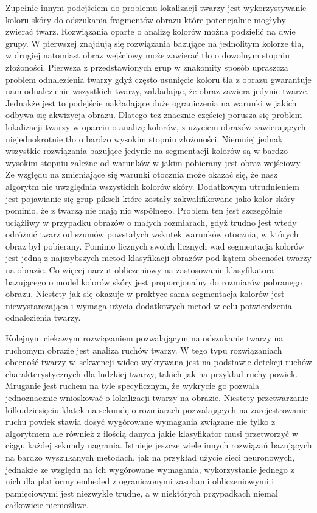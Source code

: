 Zupełnie innym podejściem do problemu lokalizacji twarzy jest wykorzystywanie
koloru skóry do odszukania fragmentów obrazu które potencjalnie mogłyby zwierać
twarz. Rozwiązania oparte o analizę kolorów można podzielić na dwie grupy. W
pierwszej znajdują się rozwiązania bazujące na jednolitym kolorze tła, w drugiej
natomiast obraz wejściowy może zawierać tło o dowolnym stopniu złożoności.
Pierwsza z przedstawionych grup w znakomity sposób upraszcza problem odnalezienia
twarzy gdyż często usunięcie koloru tła z obrazu gwarantuje nam odnalezienie
wszystkich twarzy, zakładając, że obraz zawiera jedynie twarze. Jednakże jest to
podejście nakładające duże ograniczenia na warunki w jakich odbywa się akwizycja
obrazu. Dlatego też znacznie częściej porusza się problem lokalizacji twarzy w
oparciu o analizę kolorów, z użyciem obrazów zawierających niejednokrotnie tło o
bardzo wysokim stopniu złożoności. Niemniej jednak wszystkie rozwiązania bazujące
jedynie na segmentacji kolorów są w bardzo wysokim stopniu zależne od warunków w
jakim pobierany jest obraz wejściowy. Ze względu na zmieniające się warunki
otocznia może okazać się, że nasz algorytm nie uwzględnia wszystkich kolorów
skóry. Dodatkowym utrudnieniem jest pojawianie się grup pikseli które zostały
zakwalifikowane jako kolor skóry pomimo, że z twarzą nie mają nic wspólnego.
Problem ten jest szczególnie uciążliwy w przypadku obrazów o małych rozmiarach,
gdyż trudno jest wtedy odróżnić twarz od szumów powstałych wskutek warunków
otocznia, w których obraz był pobierany. Pomimo licznych swoich licznych wad
segmentacja kolorów jest jedną z najszybszych metod klasyfikacji obrazów pod
kątem obecności twarzy na obrazie. Co więcej narzut obliczeniowy na zastosowanie
klasyfikatora bazującego o model kolorów skóry jest proporcjonalny do rozmiarów
pobranego obrazu. Niestety jak się okazuje w praktyce sama segmentacja kolorów
jest niewystarczająca i wymaga
użycia dodatkowych metod w celu potwierdzenia odnalezienia twarzy.

Kolejnym ciekawym rozwiązaniem pozwalającym na odszukanie twarzy na ruchomym
obrazie jest analiza ruchów twarzy. W tego typu rozwiązaniach obecność twarzy
w~sekwencji wideo wykrywana jest na podstawie detekcji ruchów charakterystycznych
dla ludzkiej twarzy, takich jak na przykład ruchy powiek. Mruganie jest ruchem na
tyle specyficznym, że wykrycie go pozwala jednoznacznie wnioskować o lokalizacji
twarzy na obrazie. Niestety przetwarzanie kilkudziesięciu klatek na sekundę o
rozmiarach pozwalających na zarejestrowanie ruchu powiek stawia dosyć wygórowane
wymagania związane nie tylko z algorytmem ale również z ilością danych jakie
klasyfikator musi przetworzyć w ciągu każdej sekundy nagrania. Istnieje jeszcze
wiele innych rozwiązań bazujących na bardzo wyszukanych metodach, jak na przykład
użycie sieci neuronowych, jednakże ze względu na ich wygórowane wymagania,
wykorzystanie jednego z nich dla platformy embeded z ograniczonymi zasobami
obliczeniowymi i pamięciowymi jest niezwykle trudne, a w niektórych przypadkach
niemal całkowicie niemożliwe.

